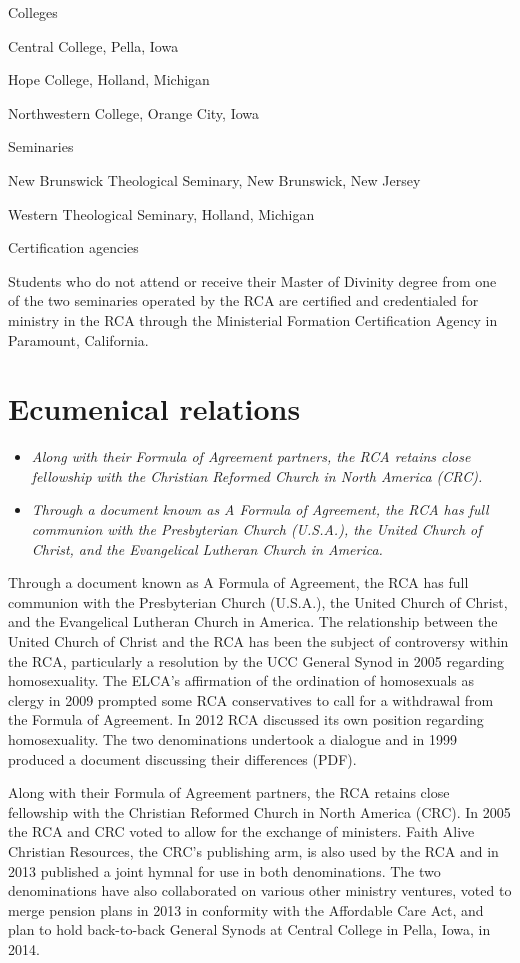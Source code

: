 Colleges

Central College, Pella, Iowa

Hope College, Holland, Michigan

Northwestern College, Orange City, Iowa

Seminaries

New Brunswick Theological Seminary, New Brunswick, New Jersey

Western Theological Seminary, Holland, Michigan

Certification agencies

Students who do not attend or receive their Master of Divinity degree
from one of the two seminaries operated by the RCA are certified and
credentialed for ministry in the RCA through the Ministerial Formation
Certification Agency in Paramount, California.

\section{Ecumenical relations}\label{ecumenical-relations}

\begin{itemize}
\item
  \emph{Along with their Formula of Agreement partners, the RCA retains
  close fellowship with the Christian Reformed Church in North America
  (CRC).}
\item
  \emph{Through a document known as A Formula of Agreement, the RCA has
  full communion with the Presbyterian Church (U.S.A.), the United
  Church of Christ, and the Evangelical Lutheran Church in America.}
\end{itemize}

Through a document known as A Formula of Agreement, the RCA has full
communion with the Presbyterian Church (U.S.A.), the United Church of
Christ, and the Evangelical Lutheran Church in America. The relationship
between the United Church of Christ and the RCA has been the subject of
controversy within the RCA, particularly a resolution by the UCC General
Synod in 2005 regarding homosexuality. The ELCA's affirmation of the
ordination of homosexuals as clergy in 2009 prompted some RCA
conservatives to call for a withdrawal from the Formula of Agreement. In
2012 RCA discussed its own position regarding homosexuality. The two
denominations undertook a dialogue and in 1999 produced a document
discussing their differences (PDF).

Along with their Formula of Agreement partners, the RCA retains close
fellowship with the Christian Reformed Church in North America (CRC). In
2005 the RCA and CRC voted to allow for the exchange of ministers. Faith
Alive Christian Resources, the CRC's publishing arm, is also used by the
RCA and in 2013 published a joint hymnal for use in both denominations.
The two denominations have also collaborated on various other ministry
ventures, voted to merge pension plans in 2013 in conformity with the
Affordable Care Act, and plan to hold back-to-back General Synods at
Central College in Pella, Iowa, in 2014.

